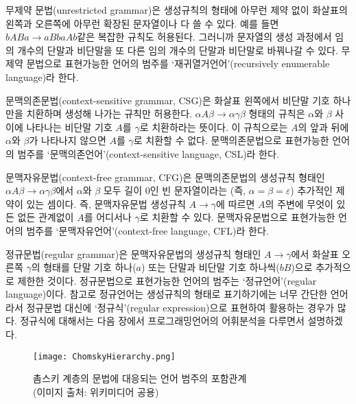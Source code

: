 무제약 문법(unrestricted grammar)은 생성규칙의 형태에 아무런 제약 없이
화살표의 왼쪽과 오른쪽에 아무런 확장된 문자열이나 다 쓸 수 있다. 예를 들면
$bABa \to aBbaAb$같은 복잡한 규칙도 허용된다. 그러니까 문자열의 생성 과정에서
임의 개수의 단말과 비단말을 또 다른 임의 개수의 단말과 비단말로 바꿔나갈 수 있다.
무제약 문법으로 표현가능한 언어의 범주를
`재귀열거언어'(recursively enumerable language)라 한다.

문맥의존문법(context-sensitive grammar, CSG)은 화살표 왼쪽에서 비단말 기호 하나만을
치환하며 생성해 나가는 규칙만 허용한다. $\alpha A\beta\to\alpha\gamma\beta$ 형태의
규칙은 $\alpha$와 $\beta$ 사이에 나타나는 비단말 기호 $A$를 $\gamma$로 치환하라는 뜻이다.
이 규칙으로는 $A$의 앞과 뒤에 $\alpha$와 $\beta$가 나타나지 않으면
$A$를 $\gamma$로 치환할 수 없다. 문맥의존문법으로 표현가능한 언어의 범주를
`문맥의존언어'(context-sensitive language, CSL)라 한다.

문맥자유문법(context-free grammar, CFG)은 문맥의존문법의 생성규칙 형태인
$\alpha A\beta\to\alpha\gamma\beta$에서 $\alpha$와 $\beta$ 모두 길이 0인
빈 문자열이라는 (즉, $\alpha=\beta=\varepsilon$) 추가적인 제약이 있는 셈이다.
즉, 문맥자유문법 생성규칙 $A\to\gamma$에 따르면 $A$의 주변에 무엇이 있든 없든
관계없이 $A$를 어디서나 $\gamma$로 치환할 수 있다. 문맥자유문법으로 표현가능한
언어의 범주를 `문맥자유언어'(context-free language, CFL)라 한다.

정규문법(regular grammar)은 문맥자유문법의 생성규칙 형태인 $A\to\gamma$에서
화살표 오른쪽 $\gamma$의 형태를 단말 기호 하나($a$) 또는
단말과 비단말 기호 하나씩($bB$)으로 추가적으로 제한한 것이다.
정규문법으로 표현가능한 언어의 범주는 `정규언어'(regular language)이다. 
참고로 정규언어는 생성규칙의 형태로 표기하기에는 너무 간단한 언어라서
정규문법 대신에 `정규식'(regular expression)으로 표현하여 활용하는 경우가 많다.
정규식에 대해서는 다음 장에서 프로그래밍언어의 어휘분석을 다루면서 설명하겠다.

\begin{figure}[b]\centering
\texttt{[image: ChomskyHierarchy.png]}
\caption{촘스키 계층의 문법에 대응되는 언어 범주의 포함관계
         \label{fig:ChomskyHierarchyLang}\\
         {\scriptsize(이미지 출처: 위키미디어 공용)} }
\end{figure}

